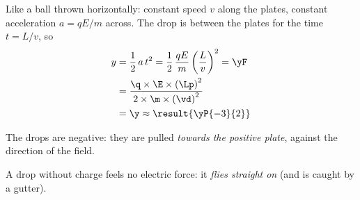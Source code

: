 \begin{abcliste}
\abc Like a ball thrown horizontally: constant speed $v$ along the plates, constant acceleration $a = q E/m$ across. The drop is between the plates for the time $t = L/v$, so
\begin{align}
 y &= \frac{1}{2}\,a\,t^2 = \frac{1}{2}\,\frac{q E}{m}\left(\frac{L}{v}\right)^2 = \yF \\
   &= \frac{\q\times\E\times\left(\Lp\right)^2}{2\times\m\times\left(\vd\right)^2} \\
   &= \y \approx \result{\yP{-3}{2}}
\end{align}

\abc The drops are negative: they are pulled \emph{towards the positive plate}, against the direction of the field.

\abc A drop without charge feels no electric force: it \emph{flies straight on} (and is caught by a gutter).
\end{abcliste}

